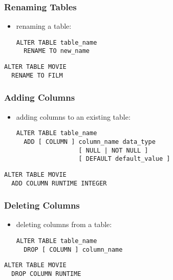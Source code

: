 \documentclass[dvipsnames]{beamer}
\theoremstyle{plain}
\begin{document}
\begin{frame}[fragile]
  \frametitle{Renaming Tables}

  \begin{itemize}
    \item renaming a table:
    \begin{lstlisting}
ALTER TABLE table_name
  RENAME TO new_name
    \end{lstlisting}
  \end{itemize}

  \medskip
  \begin{example}
    \begin{lstlisting}
ALTER TABLE MOVIE
  RENAME TO FILM
    \end{lstlisting}
  \end{example}
\end{frame}

\begin{frame}[fragile]
  \frametitle{Adding Columns}

  \begin{itemize}
    \item adding columns to an existing table:
    \begin{lstlisting}
ALTER TABLE table_name
  ADD [ COLUMN ] column_name data_type
                 [ NULL | NOT NULL ]
                 [ DEFAULT default_value ]
    \end{lstlisting}
  \end{itemize}

  \medskip
  \begin{example}
    \begin{lstlisting}
ALTER TABLE MOVIE
  ADD COLUMN RUNTIME INTEGER
    \end{lstlisting}
  \end{example}
\end{frame}

\begin{frame}[fragile]
  \frametitle{Deleting Columns}

  \begin{itemize}
    \item deleting columns from a table:
    \begin{lstlisting}
ALTER TABLE table_name
  DROP [ COLUMN ] column_name
    \end{lstlisting}
  \end{itemize}

  \medskip
  \begin{example}
    \begin{lstlisting}
ALTER TABLE MOVIE
  DROP COLUMN RUNTIME
    \end{lstlisting}
  \end{example}
\end{frame}
\end{document}

